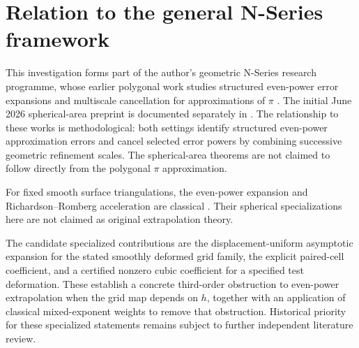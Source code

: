 \documentclass[11pt]{article}
\theoremstyle{remark}
\begin{document}
\section{Relation to the general N-Series framework}
This investigation forms part of the author's geometric N-Series research programme,
whose earlier polygonal work studies structured even-power error expansions and
multiscale cancellation for approximations of $\pi$
\cite{baker2026pi,baker2026scaling}. The initial June 2026 spherical-area
preprint is documented separately in \cite{baker2026spherical}. The
relationship to these works is methodological: both settings identify structured
even-power approximation errors and cancel selected error powers by combining
successive geometric refinement scales. The spherical-area theorems are not
claimed to follow directly from the polygonal $\pi$ approximation.

For fixed smooth surface triangulations, the even-power expansion and
Richardson--Romberg acceleration are classical
\cite{georg91,georgtausch,verlindencools,lyness94}. Their spherical
specializations here are not claimed as original extrapolation theory.

The candidate specialized contributions are the displacement-uniform
asymptotic expansion for the stated smoothly deformed grid family,
the explicit paired-cell coefficient, and a certified nonzero cubic
coefficient for a specified test deformation. These establish a concrete
third-order obstruction to even-power extrapolation when the grid map
depends on $h$, together with an application of classical mixed-exponent
weights to remove that obstruction. Historical priority for these specialized
statements remains subject to further independent literature review.

\end{document}
